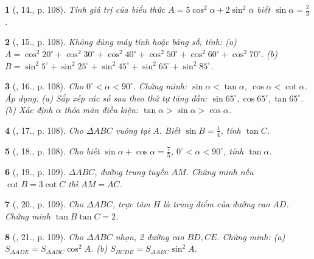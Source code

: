 \documentclass{article}
\newtheorem{baitoan}{}
\begin{document}
\begin{baitoan}[\cite{Tuyen_Toan_9_old}, 14., p. 108]
	Tính giá trị của biểu thức $A = 5\cos^2\alpha + 2\sin^2\alpha$ biết $\sin\alpha = \frac{2}{3}$.
\end{baitoan}

\begin{baitoan}[\cite{Tuyen_Toan_9_old}, 15., p. 108]
	Không dùng máy tính hoặc bảng số, tính: (a) $A = \cos^2 20^\circ + \cos^2 30^\circ + \cos^2 40^\circ + \cos^2 50^\circ + \cos^2 60^\circ + \cos^2 70^\circ$. (b) $B = \sin^2 5^\circ + \sin^2 25^\circ + \sin^2 45^\circ + \sin^2 65^\circ + \sin^2 85^\circ$.
\end{baitoan}

\begin{baitoan}[\cite{Tuyen_Toan_9_old}, 16., p. 108]
	Cho $0^\circ < \alpha < 90^\circ$. Chứng minh: $\sin\alpha < \tan\alpha$, $\cos\alpha < \cot\alpha$. Áp dụng: (a) Sắp xếp các số sau theo thứ tự tăng dần: $\sin 65^\circ,\cos 65^\circ,\tan 65^\circ$. (b) Xác định $\alpha$ thỏa mãn điều kiện: $\tan\alpha > \sin\alpha > \cos\alpha$.
\end{baitoan}

\begin{baitoan}[\cite{Tuyen_Toan_9_old}, 17., p. 108]
	Cho $\Delta ABC$ vuông tại $A$. Biết $\sin B = \frac{1}{4}$, tính $\tan C$.
\end{baitoan}

\begin{baitoan}[\cite{Tuyen_Toan_9_old}, 18., p. 108]
	Cho biết $\sin\alpha + \cos\alpha = \frac{7}{5}$, $0^\circ < \alpha < 90^\circ$, tính $\tan\alpha$.
\end{baitoan}

\begin{baitoan}[\cite{Tuyen_Toan_9_old}, 19., p. 109]
	$\Delta ABC$, đường trung tuyến $AM$. Chứng minh nếu $\cot B = 3\cot C$ thì $AM = AC$.
\end{baitoan}

\begin{baitoan}[\cite{Tuyen_Toan_9_old}, 20., p. 109]
	Cho $\Delta ABC$, trực tâm $H$ là trung điểm của đường cao $AD$. Chứng minh $\tan B\tan C = 2$.
\end{baitoan}

\begin{baitoan}[\cite{Tuyen_Toan_9_old}, 21., p. 109]
	Cho $\Delta ABC$ nhọn, 2 đường cao $BD,CE$. Chứng minh: (a) $S_{\Delta ADE} = S_{\Delta ABC}\cos^2A$. (b) $S_{BCDE} = S_{\Delta ABC}\sin^2A$.
\end{baitoan}
\end{document}
